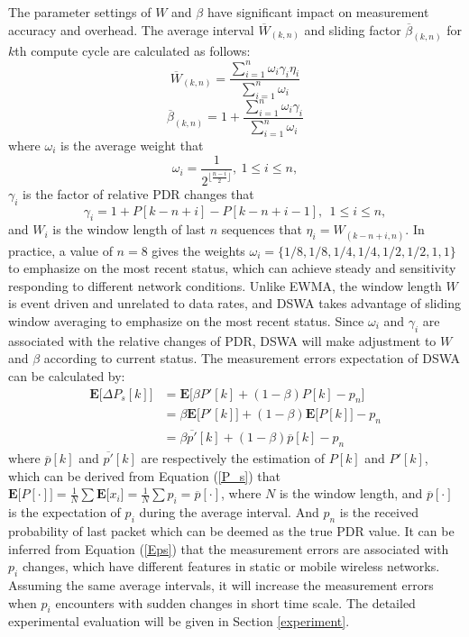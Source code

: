 \documentclass[draftclsnofoot,journal,onecolumn,11pt]{IEEEtran}
\begin{document}
The parameter settings of $W$ and $\beta$ have significant impact on measurement accuracy and overhead. The average interval $\overline{W}_{(k,n)}$ and sliding factor $\overline{\beta}_{(k,n)}$ for $k$th compute cycle are calculated as follows:
\begin{equation}
  \overline{W}_{(k,n)} = \frac{\sum_{i=1}^n{\omega_i \gamma_i} \eta_{i}}{\sum_{i=1}^n{\omega_i}}
\label{W_s}
\end{equation}
\begin{equation}
  \overline{\beta}_{(k,n)} = 1 + \frac{\sum_{i=1}^n{\omega_i \gamma_i}}{\sum_{i=1}^n{\omega_i}}
\label{beta}
\end{equation}
where $\omega_i$ is the average weight that
\begin{equation}
  \omega_i = \frac{1}{2^{\lfloor\frac{n-i}{2}\rfloor}},~1\leq i \leq n,
\end{equation}
$\gamma_i$ is the factor of relative PDR changes that
\begin{equation}
  \gamma_i = 1 + P[k-n+i] - P[k-n+i-1],~~ 1 \leq i \leq n,
\label{gamma_i}
\end{equation}
and $W_i$ is the window length of last $n$ sequences that $\eta_i=W_{(k-n+i,n)}$. In practice, a value of $n=8$ gives the weights $\omega_i=\{1/8,1/8,1/4,1/4,1/2,1/2,1,1\}$ to emphasize on the most recent status, which can achieve steady and sensitivity responding to different network conditions. Unlike EWMA, the window length $W$ is event driven and unrelated to data rates, and DSWA takes advantage of sliding window averaging to emphasize on the most recent status. Since $\omega_i$ and $\gamma_i$ are associated with the relative changes of PDR, DSWA will make adjustment to $W$ and $\beta$ according to current status. The measurement errors expectation of DSWA can be calculated by:
\begin{equation}
\begin{split}
 \textbf{E[}\Delta P_s[k]\textbf{]}&=\textbf{E[}\beta P'[k]+(1-\beta)P[k]-p_{n}\textbf{]}\\
                                       &=\beta\textbf{E[}P'[k]\textbf{]}+(1-\beta)\textbf{E[}P[k]\textbf{]}-p_{n}\\
                                       &=\beta\overline{p'}[k]+(1-\beta)\overline{p}[k]-p_{n}
\end{split}
\label{Eps}
\end{equation}
where $\overline{p}[k]$ and $\overline{p'}[k]$ are respectively the estimation of $P[k]$ and $P'[k]$, which can be derived from Equation (\ref{P_s}) that $\textbf{E[}P[\cdot]\textbf{]}=\frac{1}{N}\sum\textbf{E[}x_i\textbf{]}=\frac{1}{N}\sum{p_i}=\overline{p}[\cdot]$, where $N$ is the window length, and $\overline{p}[\cdot]$ is the expectation of $p_i$ during the average interval. And $p_n$ is the received probability of last packet which can be deemed as the true PDR value. It can be inferred from Equation (\ref{Eps}) that the measurement errors are associated with $p_i$ changes, which have different features in static or mobile wireless networks. Assuming the same average intervals, it will increase the measurement errors when $p_i$ encounters with sudden changes in short time scale. The detailed experimental evaluation will be given in Section \ref{experiment}.
\end{document}

